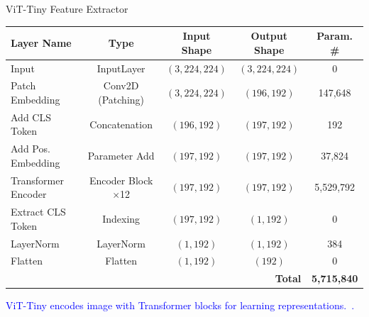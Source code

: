 \documentclass[aspectratio=169]{beamer}
\let\oldcite\cite %
\renewcommand{\cite}[1]{{\tiny\oldcite{#1}}}
\begin{document}
\begin{frame}{ViT-Tiny Feature Extractor}

\begin{table}
\begin{tabularx}{\linewidth}{lcccc}
\toprule
\textbf{Layer Name} & \textbf{Type} & \textbf{Input Shape} & \textbf{Output Shape} & \textbf{Param. \#} \\
\midrule
Input & InputLayer & $(3,224,224)$ & $(3,224,224)$ & 0 \\
Patch Embedding & Conv2D (Patching) & $(3,224,224)$ & $(196,192)$ & 147,648 \\
Add CLS Token & Concatenation & $(196,192)$ & $(197,192)$ & 192 \\
Add Pos. Embedding & Parameter Add & $(197,192)$ & $(197,192)$ & 37,824 \\
Transformer Encoder & Encoder Block $\times$12 & $(197,192)$ & $(197,192)$ & 5,529,792 \\
Extract CLS Token & Indexing & $(197,192)$ & $(1,192)$ & 0 \\
LayerNorm & LayerNorm & $(1,192)$ & $(1,192)$ & 384 \\
Flatten & Flatten & $(1,192)$ & $(192)$ & 0 \\
\midrule
\multicolumn{4}{r}{\textbf{Total}} & \textbf{5,715,840} \\
\midrule
\end{tabularx}
\end{table}
\begin{center}
    \textcolor{blue}{ViT-Tiny encodes image with  Transformer blocks for learning representations.~\cite{dosovitskiy2020image}.}
\end{center}

\end{frame}
\end{document}

